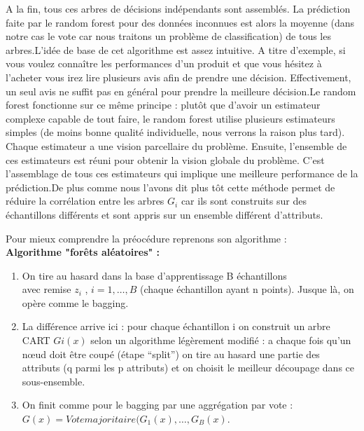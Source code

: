 \documentclass[11pt]{article}
\begin{document}
A la fin, tous ces arbres de décisions indépendants sont assemblés. La prédiction faite par le random forest pour des données inconnues est alors la moyenne (dans notre cas le vote car nous traitons un problème de classification) de tous les arbres.L'idée de base de cet algorithme est assez intuitive. A titre d’exemple, si vous voulez connaître les performances d’un produit et que vous hésitez à l’acheter vous irez lire plusieurs avis afin de prendre une décision. Effectivement, un seul avis ne suffit pas en général pour prendre la meilleure décision.Le random forest fonctionne sur ce même principe : plutôt que d'avoir un estimateur complexe capable de tout faire, le random forest utilise plusieurs estimateurs simples (de moins bonne qualité individuelle, nous verrons la raison plus tard). Chaque estimateur a une vision parcellaire du problème. Ensuite, l'ensemble de ces estimateurs est réuni pour obtenir la vision globale du problème. C'est l'assemblage de tous ces estimateurs qui implique une meilleure performance de la prédiction.De plus comme nous l'avons dit plus tôt cette méthode permet de réduire la corrélation entre les arbres $G_{i}$ car ils sont construits sur des échantillons différents et sont appris sur un ensemble différent d’attributs.\par

Pour mieux comprendre la préocédure reprenons son algorithme : \\


\textbf{Algorithme "forêts aléatoires" :}\\

\begin{enumerate}
    \item  On tire au hasard dans la base d’apprentissage B échantillons\\avec remise $z_{i}$ , $i=1,…,B$ (chaque échantillon ayant n points).
    Jusque là, on opère comme le bagging.

    \item  La différence arrive ici : pour chaque échantillon i on construit un arbre CART $Gi(x)$ selon un algorithme légèrement modifié : a chaque fois qu’un nœud doit être coupé (étape “split”) on tire au hasard une partie des attributs (q parmi les p attributs) et on choisit le meilleur découpage dans ce sous-ensemble.

    \item On finit comme pour le bagging par une aggrégation par vote :\\
      $G(x)=Votemajoritaire(G_{1}(x),…,G_{B}(x)$.
\end{enumerate}
\end{document}
